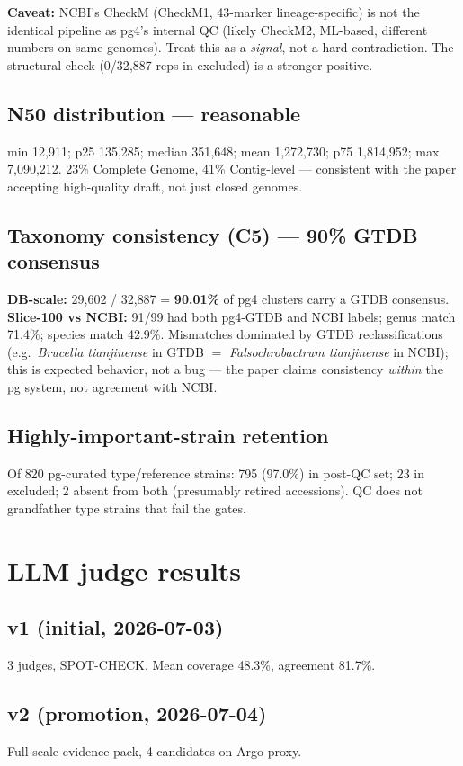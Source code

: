 \documentclass[11pt]{article}
\begin{document}
\textbf{Caveat:} NCBI's CheckM (CheckM1, 43-marker lineage-specific) is not the identical pipeline as pg4's internal QC (likely CheckM2, ML-based, different numbers on same genomes). Treat this as a \emph{signal}, not a hard contradiction. The structural check (0/32{,}887 reps in excluded) is a stronger positive.

\subsection{N50 distribution --- reasonable}
min 12{,}911; p25 135{,}285; median 351{,}648; mean 1{,}272{,}730; p75 1{,}814{,}952; max 7{,}090{,}212. 23\% Complete Genome, 41\% Contig-level --- consistent with the paper accepting high-quality draft, not just closed genomes.

\subsection{Taxonomy consistency (C5) --- \textcolor{green!50!black}{90\% GTDB consensus}}
\textbf{DB-scale:} 29{,}602 / 32{,}887 = \textbf{90.01\%} of pg4 clusters carry a GTDB consensus. \textbf{Slice-100 vs NCBI:} 91/99 had both pg4-GTDB and NCBI labels; genus match 71.4\%; species match 42.9\%. Mismatches dominated by GTDB reclassifications (e.g.\ \emph{Brucella tianjinense} in GTDB $=$ \emph{Falsochrobactrum tianjinense} in NCBI); this is expected behavior, not a bug --- the paper claims consistency \emph{within} the pg system, not agreement with NCBI.

\subsection{Highly-important-strain retention}
Of 820 pg-curated type/reference strains: 795 (97.0\%) in post-QC set; 23 in excluded; 2 absent from both (presumably retired accessions). QC does not grandfather type strains that fail the gates.

\section{LLM judge results}
\subsection*{v1 (initial, 2026-07-03)}
3 judges, SPOT-CHECK. Mean coverage 48.3\%, agreement 81.7\%.

\subsection*{v2 (promotion, 2026-07-04)}
Full-scale evidence pack, 4 candidates on Argo proxy.
\end{document}
